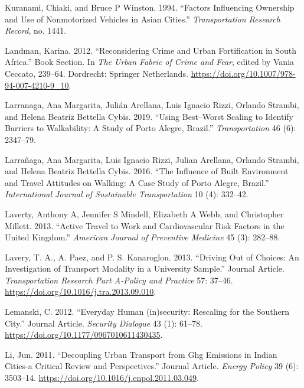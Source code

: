 \documentclass[]{elsarticle} %
\begin{document}
\leavevmode\hypertarget{ref-kuranami1994factors}{}%
Kuranami, Chiaki, and Bruce P Winston. 1994. ``Factors Influencing
Ownership and Use of Nonmotorized Vehicles in Asian Cities.''
\emph{Transportation Research Record}, no. 1441.

\leavevmode\hypertarget{ref-Landman2012crime}{}%
Landman, Karina. 2012. ``Reconsidering Crime and Urban Fortification in
South Africa.'' Book Section. In \emph{The Urban Fabric of Crime and
Fear}, edited by Vania Ceccato, 239--64. Dordrecht: Springer
Netherlands. \url{https://doi.org/10.1007/978-94-007-4210-9_10}.

\leavevmode\hypertarget{ref-larranaga2019using}{}%
Larranaga, Ana Margarita, Julián Arellana, Luis Ignacio Rizzi, Orlando
Strambi, and Helena Beatriz Bettella Cybis. 2019. ``Using Best--Worst
Scaling to Identify Barriers to Walkability: A Study of Porto Alegre,
Brazil.'' \emph{Transportation} 46 (6): 2347--79.

\leavevmode\hypertarget{ref-larranaga2016influence}{}%
Larrañaga, Ana Margarita, Luis Ignacio Rizzi, Julian Arellana, Orlando
Strambi, and Helena Beatriz Bettella Cybis. 2016. ``The Influence of
Built Environment and Travel Attitudes on Walking: A Case Study of Porto
Alegre, Brazil.'' \emph{International Journal of Sustainable
Transportation} 10 (4): 332--42.

\leavevmode\hypertarget{ref-laverty2013active}{}%
Laverty, Anthony A, Jennifer S Mindell, Elizabeth A Webb, and
Christopher Millett. 2013. ``Active Travel to Work and Cardiovascular
Risk Factors in the United Kingdom.'' \emph{American Journal of
Preventive Medicine} 45 (3): 282--88.

\leavevmode\hypertarget{ref-Lavery2013driving}{}%
Lavery, T. A., A. Paez, and P. S. Kanaroglou. 2013. ``Driving Out of
Choices: An Investigation of Transport Modality in a University
Sample.'' Journal Article. \emph{Transportation Research Part A-Policy
and Practice} 57: 37--46.
\url{https://doi.org/10.1016/j.tra.2013.09.010}.

\leavevmode\hypertarget{ref-Lemanski2012everyday}{}%
Lemanski, C. 2012. ``Everyday Human (in)security: Rescaling for the
Southern City.'' Journal Article. \emph{Security Dialogue} 43 (1):
61--78. \url{https://doi.org/10.1177/0967010611430435}.

\leavevmode\hypertarget{ref-Li2011decoupling}{}%
Li, Jun. 2011. ``Decoupling Urban Transport from Ghg Emissions in Indian
Cities-a Critical Review and Perspectives.'' Journal Article.
\emph{Energy Policy} 39 (6): 3503--14.
\url{https://doi.org/10.1016/j.enpol.2011.03.049}.
\end{document}
